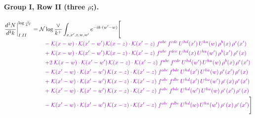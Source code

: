 \documentclass[10pt]{article}
\numberwithin{equation}{section}
\newcommand{\NNv}{\mathcal N\log\frac{\vee}{k^+}}
\begin{document}
\paragraph{Group I, Row II (three $\rho$;).}
\begin{align}
\frac{d^3N}{d^3k}\bigg|^{\log\frac{\vee}{k^+}}_{I.II}={}&\NNv\int_{x,x',z,w,w'}e^{-ik\cdot(w'-w)}\Bigg[\notag\\
&\quad{\color{CC}-\;\mathcal{K}(x-w)\cdot\mathcal{K}(x'-w')\,\mathcal{K}(x-z)\cdot\mathcal{K}(x'-z)\;f^{abc}\,f^{cde}\,U^{hd}(x')\,U^{ha}(w)\,\rho^{b}(x)\,\rho^{e}(x')}\notag\\
&\quad{\color{CC}+\;\mathcal{K}(x-w)\cdot\mathcal{K}(x'-w')\,\mathcal{K}(x-z)\cdot\mathcal{K}(x'-z)\;f^{abc}\,f^{dce}\,U^{hd}(x)\,U^{ha}(w')\,\rho^{b}(x')\,\rho^{e}(x)}\notag\\
&\quad{\color{CC}+2\;\mathcal{K}(x-w)\cdot\mathcal{K}(x'-w')\,\mathcal{K}(x-z)\cdot\mathcal{K}(x'-z)\;f^{abc}\,f^{cde}\,U^{hd}(w')\,U^{ha}(w)\,\rho^{b}(x)\,\rho^{e}(x')}\notag\\
&\quad{\color{CC}-\;\mathcal{K}(x'-w)\cdot\mathcal{K}(x'-w')\,\mathcal{K}(x-z)\cdot\mathcal{K}(x'-z)\;f^{abc}\,f^{bde}\,U^{hd}(x')\,U^{ha}(w)\,\rho^{e}(x')\,\rho^{c}(x)}\notag\\
&\quad{\color{CC}+\;\mathcal{K}(x'-w)\cdot\mathcal{K}(x'-w')\,\mathcal{K}(x-z)\cdot\mathcal{K}(x'-z)\;f^{abc}\,f^{dbe}\,U^{hd}(x')\,U^{ha}(w')\,\rho^{c}(x)\,\rho^{e}(x')}\notag\\
&\quad{\color{CC}+\;\mathcal{K}(x'-w)\cdot\mathcal{K}(x'-w')\,\mathcal{K}(x-z)\cdot\mathcal{K}(x'-z)\;f^{abc}\,f^{bde}\,U^{hd}(w')\,U^{ha}(w)\,\rho^{e}(x')\,\rho^{c}(x)}\notag\\
&\quad{\color{CC}-\;\mathcal{K}(x'-w)\cdot\mathcal{K}(x'-w')\,\mathcal{K}(x-z)\cdot\mathcal{K}(x'-z)\;f^{abc}\,f^{dbe}\,U^{hd}(w)\,U^{ha}(w')\,\rho^{c}(x)\,\rho^{e}(x')}\Bigg]\label{eq:P0}
\end{align}
\end{document}
